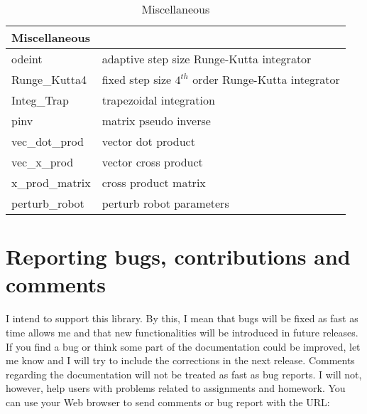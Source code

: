 \documentclass[dvips,11pt,fleqn]{report}
\newcommand{\mbold}[1]{\mbox{\boldmath $ #1 $}}
\newcommand{\dfdx}[2]{\frac{\partial #1}{\partial #2}}
\begin{document}
\begin{table}[htbp]
\begin{center}
\end{center}
\end{table}

\begin{table}[htbp]
\caption{Miscellaneous}
\label{tab:commandsum3}
\begin{center}
\begin{tabular}{||l|l||}
\hline
\hline
\multicolumn{2}{||l||}{{\bf Miscellaneous}} \\
\hline
\hline
odeint & adaptive step size Runge-Kutta integrator \\
\hline
Runge\_Kutta4 & fixed step size $4^{th}$ order Runge-Kutta integrator \\
\hline
Integ\_Trap & trapezoidal integration \\
\hline
pinv & matrix pseudo inverse \\
\hline
vec\_dot\_prod & vector dot product \\
\hline
vec\_x\_prod & vector cross product \\
\hline
x\_prod\_matrix & cross product matrix\\
\hline
perturb\_robot & perturb robot parameters \\
\hline
\hline
\end{tabular}
\end{center}
\end{table}


\chapter{Reporting bugs, contributions and comments}

I intend to support this library. By this, I mean that bugs will be fixed as fast as
time allows me and that new functionalities will be introduced in future releases.
If you find a bug or think some part of the documentation could be improved, 
let me know and I will try to include the corrections in the next release.
Comments regarding the documentation will not be treated as fast as bug reports. 
I will not, however, help users with problems related to assignments and homework.
You can use your Web browser to send comments or bug report with the URL: 
\end{document}
